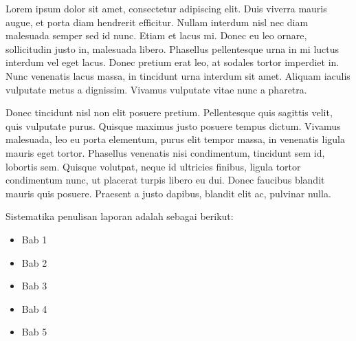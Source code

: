 Lorem ipsum dolor sit amet, consectetur adipiscing elit. Duis viverra mauris augue, et porta diam hendrerit efficitur. Nullam interdum nisl nec diam malesuada semper sed id nunc. Etiam et lacus mi. Donec eu leo ornare, sollicitudin justo in, malesuada libero. Phasellus pellentesque urna in mi luctus interdum vel eget lacus. Donec pretium erat leo, at sodales tortor imperdiet in. Nunc venenatis lacus massa, in tincidunt urna interdum sit amet. Aliquam iaculis vulputate metus a dignissim. Vivamus vulputate vitae nunc a pharetra.

Donec tincidunt nisl non elit posuere pretium. Pellentesque quis sagittis velit, quis vulputate purus. Quisque maximus justo posuere tempus dictum. Vivamus malesuada, leo eu porta elementum, purus elit tempor massa, in venenatis ligula mauris eget tortor. Phasellus venenatis nisi condimentum, tincidunt sem id, lobortis sem. Quisque volutpat, neque id ultricies finibus, ligula tortor condimentum nunc, ut placerat turpis libero eu dui. Donec faucibus blandit mauris quis posuere. Praesent a justo dapibus, blandit elit ac, pulvinar nulla. 

Sistematika penulisan laporan adalah sebagai berikut:
\begin{itemize}
	\item Bab 1 \babSatu \\
	\item Bab 2 \babDua \\
	\item Bab 3 \babTiga \\
	\item Bab 4 \babEmpat \\
	\item Bab 5 \kesimpulan \\
\end{itemize}


